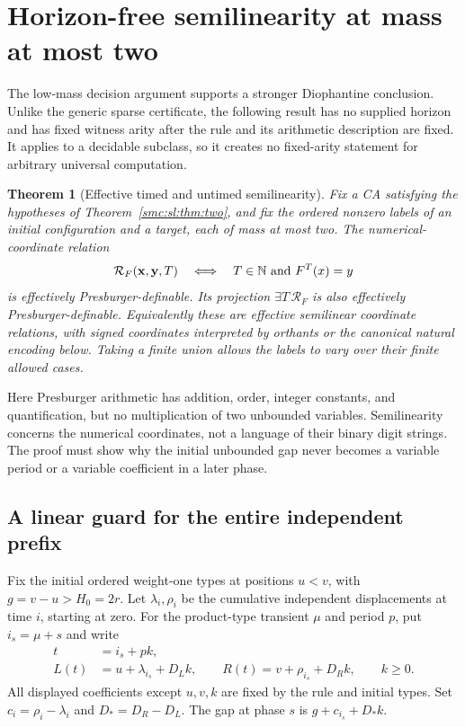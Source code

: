 \documentclass[11pt,letterpaper]{article}
\numberwithin{equation}{section}
\newtheorem{theorem}{Theorem}[section]
\theoremstyle{definition}
\theoremstyle{remark}
\newcommand{\NN}{\mathbb N}
\begin{document}
\section{Horizon-free semilinearity at mass at most two}\label{smc:sl:sec:semilinearity}
The low-mass decision argument supports a stronger Diophantine conclusion. Unlike the generic sparse certificate, the following result has no supplied horizon and has fixed witness arity after the rule and its arithmetic description are fixed. It applies to a decidable subclass, so it creates no fixed-arity statement for arbitrary universal computation.

\begin{theorem}[Effective timed and untimed semilinearity]\label{smc:sl:thm:semilinear}
Fix a CA satisfying the hypotheses of Theorem~\ref{smc:sl:thm:two}, and fix the ordered nonzero labels of an initial configuration and a target, each of mass at most two. The numerical-coordinate relation
\[
 \mathcal R_F(\mathbf x,\mathbf y,T)\quad\Longleftrightarrow\quad
 T\in\NN\ \hbox{and}\ F^T(x)=y
\]
is effectively Presburger-definable. Its projection $\exists T\,\mathcal R_F$ is also effectively Presburger-definable. Equivalently these are effective semilinear coordinate relations, with signed coordinates interpreted by orthants or the canonical natural encoding below. Taking a finite union allows the labels to vary over their finite allowed cases.
\end{theorem}
Here Presburger arithmetic has addition, order, integer constants, and quantification, but no multiplication of two unbounded variables. Semilinearity concerns the numerical coordinates, not a language of their binary digit strings. The proof must show why the initial unbounded gap never becomes a variable period or a variable coefficient in a later phase.

\subsection{A linear guard for the entire independent prefix}
Fix the initial ordered weight-one types at positions $u<v$, with $g=v-u>H_0=2r$. Let $\lambda_i,\rho_i$ be the cumulative independent displacements at time $i$, starting at zero. For the product-type transient $\mu$ and period $p$, put $i_s=\mu+s$ and write
\begin{align}
 t&=i_s+pk,\nonumber\\
 L(t)&=u+\lambda_{i_s}+D_Lk,\qquad
 R(t)=v+\rho_{i_s}+D_Rk,\qquad k\ge0.\label{smc:sl:eq:freephase}
\end{align}
All displayed coefficients except $u,v,k$ are fixed by the rule and initial types. Set $c_i=\rho_i-\lambda_i$ and $D_*=D_R-D_L$. The gap at phase $s$ is $g+c_{i_s}+D_*k$.
\end{document}
